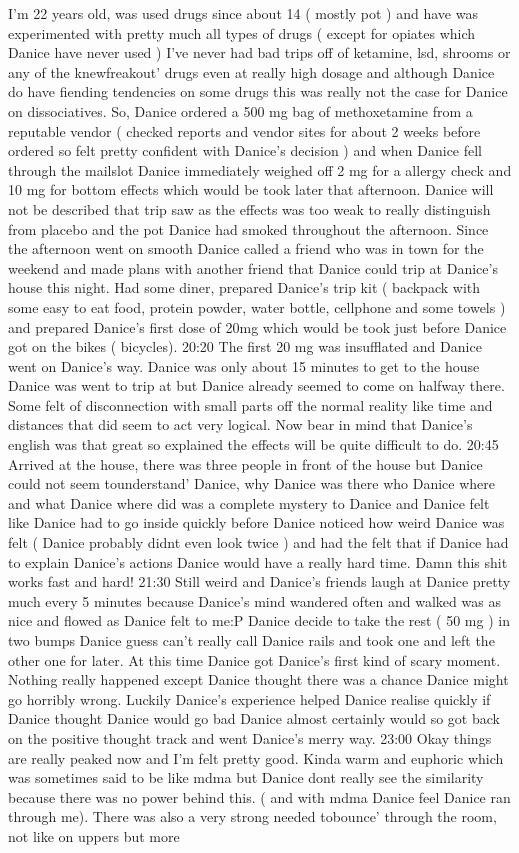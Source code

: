 \documentclass[12pt]{book}
\begin{document}
I'm 22 years old, was used drugs since about 14 ( mostly pot ) and have was experimented with pretty much all types of drugs ( except for opiates which Danice have never used ) I've never had bad trips off of ketamine, lsd, shrooms or any of the knewfreakout' drugs even at really high dosage and although Danice do have fiending tendencies on some drugs this was really not the case for Danice on dissociatives. So, Danice ordered a 500 mg bag of methoxetamine from a reputable vendor ( checked reports and vendor sites for about 2 weeks before ordered so felt pretty confident with Danice's decision ) and when Danice fell through the mailslot Danice immediately weighed off 2 mg for a allergy check and 10 mg for bottom effects which would be took later that afternoon. Danice will not be described that trip saw as the effects was too weak to really distinguish from placebo and the pot Danice had smoked throughout the afternoon. Since the afternoon went on smooth Danice called a friend who was in town for the weekend and made plans with another friend that Danice could trip at Danice's house this night. Had some diner, prepared Danice's trip kit ( backpack with some easy to eat food, protein powder, water bottle, cellphone and some towels ) and prepared Danice's first dose of 20mg which would be took just before Danice got on the bikes ( bicycles). 20:20 The first 20 mg was insufflated and Danice went on Danice's way. Danice was only about 15 minutes to get to the house Danice was went to trip at but Danice already seemed to come on halfway there. Some felt of disconnection with small parts off the normal reality like time and distances that did seem to act very logical. Now bear in mind that Danice's english was that great so explained the effects will be quite difficult to do. 20:45 Arrived at the house, there was three people in front of the house but Danice could not seem tounderstand' Danice, why Danice was there who Danice where and what Danice where did was a complete mystery to Danice and Danice felt like Danice had to go inside quickly before Danice noticed how weird Danice was felt ( Danice probably didnt even look twice ) and had the felt that if Danice had to explain Danice's actions Danice would have a really hard time. Damn this shit works fast and hard! 21:30 Still weird and Danice's friends laugh at Danice pretty much every 5 minutes because Danice's mind wandered often and walked was as nice and flowed as Danice felt to me:P Danice decide to take the rest ( 50 mg ) in two bumps Danice guess can't really call Danice rails and took one and left the other one for later. At this time Danice got Danice's first kind of scary moment. Nothing really happened except Danice thought there was a chance Danice might go horribly wrong. Luckily Danice's experience helped Danice realise quickly if Danice thought Danice would go bad Danice almost certainly would so got back on the positive thought track and went Danice's merry way. 23:00 Okay things are really peaked now and I'm felt pretty good. Kinda warm and euphoric which was sometimes said to be like mdma but Danice dont really see the similarity because there was no power behind this. ( and with mdma Danice feel Danice ran through me). There was also a very strong needed tobounce' through the room, not like on uppers but more 
\end{document}
